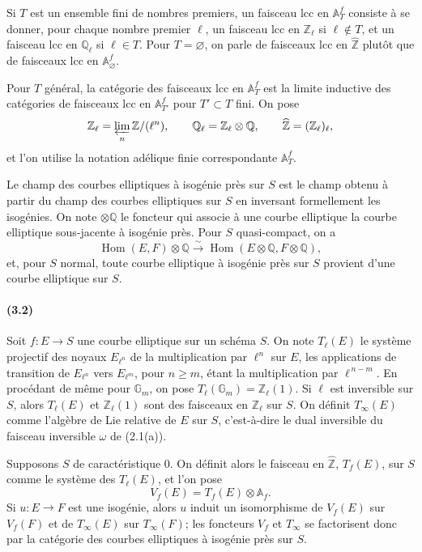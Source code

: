 \documentclass[10pt]{article}
\newcommand{\Af}{\mathbb A_f}
\newcommand{\Q}{\mathbb Q}
\newcommand{\Z}{\mathbb Z}
\newcommand{\bZ}{\widehat{\mathbb Z}}
\newcommand{\Gm}{\mathbb G_m}
\newcommand{\Hom}{\operatorname{Hom}}
\begin{document}
Si $T$ est un ensemble fini de nombres premiers, un faisceau lcc en $\mathbb A_T^f$ consiste à se
donner, pour chaque nombre premier $\ell$, un faisceau lcc en $\Z_\ell$ si $\ell\notin T$,
et un faisceau lcc en $\Q_\ell$ si $\ell\in T$. Pour $T=\varnothing$, on parle de faisceaux
lcc en $\bZ$ plutôt que de faisceaux lcc en $\mathbb A_\varnothing^f$.

Pour $T$ général, la catégorie des faisceaux lcc en $\mathbb A_T^f$ est la limite inductive des
catégories de faisceaux lcc en $\mathbb A_{T'}^f$ pour $T'\subset T$ fini. On pose
\[
\Z_\ell=\varprojlim_n \Z/(\ell^n),\qquad
\Q_\ell=\Z_\ell\otimes\Q,\qquad
\bZ=(\Z_\ell)_\ell,
\]
et l'on utilise la notation adélique finie correspondante $\mathbb A_T^f$.

Le champ des courbes elliptiques à isogénie près sur $S$ est le champ obtenu à partir du
champ des courbes elliptiques sur $S$ en inversant formellement les isogénies. On note
$\otimes\Q$ le foncteur qui associe à une courbe elliptique la courbe elliptique sous-jacente
à isogénie près. Pour $S$ quasi-compact, on a
\[
\Hom(E,F)\otimes\Q\xrightarrow{\sim}\Hom(E\otimes\Q,F\otimes\Q),
\]
et, pour $S$ normal, toute courbe elliptique à isogénie près sur $S$ provient d'une courbe
elliptique sur $S$.

\paragraph{(3.2)}
Soit $f:E\to S$ une courbe elliptique sur un schéma $S$. On note $T_\ell(E)$ le système
projectif des noyaux $E_{\ell^n}$ de la multiplication par $\ell^n$ sur $E$, les applications
de transition de $E_{\ell^n}$ vers $E_{\ell^m}$, pour $n\ge m$, étant la multiplication par
$\ell^{\,n-m}$. En procédant de même pour $\Gm$, on pose $T_\ell(\Gm)=\Z_\ell(1)$.
Si $\ell$ est inversible sur $S$, alors $T_\ell(E)$ et $\Z_\ell(1)$ sont des faisceaux en
$\Z_\ell$ sur $S$. On définit $T_\infty(E)$ comme l'algèbre de Lie relative de $E$ sur
$S$, c'est-à-dire le dual inversible du faisceau inversible $\omega$ de (2.1(a)).

Supposons $S$ de caractéristique $0$. On définit alors le faisceau en $\bZ$, $T_f(E)$,
sur $S$ comme le système des $T_\ell(E)$, et l'on pose
\[
V_f(E)=T_f(E)\otimes \Af.
\]
Si $u:E\to F$ est une isogénie, alors $u$ induit un isomorphisme de $V_f(E)$ sur $V_f(F)$
et de $T_\infty(E)$ sur $T_\infty(F)$; les foncteurs $V_f$ et $T_\infty$ se factorisent donc
par la catégorie des courbes elliptiques à isogénie près sur $S$.
\end{document}
